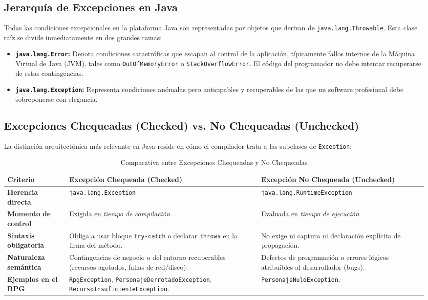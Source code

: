 \documentclass[11pt,letterpaper]{article}
\begin{document}
\subsection{Jerarquía de Excepciones en Java}
Todas las condiciones excepcionales en la plataforma Java son representadas por objetos que derivan de \texttt{java.lang.Throwable}. Esta clase raíz se divide inmediatamente en dos grandes ramas:
\begin{itemize}
    \item \textbf{\texttt{java.lang.Error}:} Denota condiciones catastróficas que escapan al control de la aplicación, típicamente fallos internos de la Máquina Virtual de Java (JVM), tales como \texttt{OutOfMemoryError} o \texttt{StackOverflowError}. El código del programador no debe intentar recuperarse de estas contingencias.
    \item \textbf{\texttt{java.lang.Exception}:} Representa condiciones anómalas pero anticipables y recuperables de las que un software profesional debe sobreponerse con elegancia.
\end{itemize}

\subsection{Excepciones Chequeadas (Checked) vs. No Chequeadas (Unchecked)}
La distinción arquitectónica más relevante en Java reside en cómo el compilador trata a las subclases de \texttt{Exception}:

\begin{table}[h!]
    \centering
    \caption{Comparativa entre Excepciones Chequeadas y No Chequeadas}
    \vspace{0.2cm}
    \small
    \begin{tabularx}{\textwidth}{p{3.2cm}X X}
        \toprule
        \textbf{Criterio} & \textbf{Excepción Chequeada (Checked)} & \textbf{Excepción No Chequeada (Unchecked)} \\
        \midrule
        \textbf{Herencia directa} & \texttt{java.lang.Exception} & \texttt{java.lang.RuntimeException} \\
        \textbf{Momento de control} & Exigida en \textit{tiempo de compilación}. & Evaluada en \textit{tiempo de ejecución}. \\
        \textbf{Sintaxis obligatoria} & Obliga a usar bloque \texttt{try-catch} o declarar \texttt{throws} en la firma del método. & No exige ni captura ni declaración explícita de propagación. \\
        \textbf{Naturaleza semántica} & Contingencias de negocio o del entorno recuperables (recursos agotados, fallas de red/disco). & Defectos de programación o errores lógicos atribuibles al desarrollador (bugs). \\
        \textbf{Ejemplos en el RPG} & \texttt{RpgException}, \texttt{PersonajeDerrotadoException}, \texttt{RecursoInsuficienteException}. & \texttt{PersonajeNuloException}. \\
        \bottomrule
    \end{tabularx}
\end{table}
\end{document}
